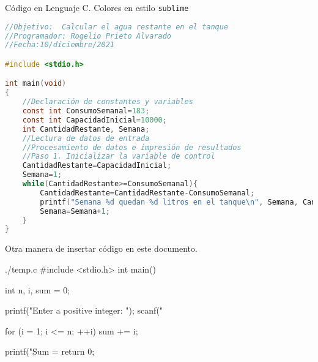 \documentclass[spanish,11pt,twoside]{article}
\begin{document}
\vspace{20pt}
Código en Lenguaje C. Colores en estilo \texttt{sublime}
\begin{mdframed}[backgroundcolor=clr-background,topline=true,bottomline=true,leftline=false,rightline=false,innerleftmargin=\leftskip, innertopmargin=0pt]

	\begin{lstlisting}[language=C]
//Objetivo:  Calcular el agua restante en el tanque 
//Programador: Rogelio Prieto Alvarado
//Fecha:10/diciembre/2021

#include <stdio.h>

int main(void)
{
	//Declaración de constantes y variables
	const int ConsumoSemanal=183;
	const int CapacidadInicial=10000;
	int CantidadRestante, Semana;
	//Lectura de datos de entrada
	//Procesamiento de datos e impresión de resultados
	//Paso 1. Inicializar la variable de control
	CantidadRestante=CapacidadInicial;
	Semana=1;
	while(CantidadRestante>=ConsumoSemanal){
		CantidadRestante=CantidadRestante-ConsumoSemanal;
		printf("Semana %d quedan %d litros en el tanque\n", Semana, CantidadRestante);
		Semana=Semana+1;
	}
} \end{lstlisting}
\end{mdframed}




\newpage
Otra manera de insertar código en este documento.

\begin{verbatimwrite}{./temp.c}
	#include <stdio.h>
	int main() {
		int n, i, sum = 0;
		
		printf("Enter a positive integer: ");
		scanf("%
		
		for (i = 1; i <= n; ++i) {
			sum += i;
		}
		
		printf("Sum = %
		return 0;
	}
\end{verbatimwrite}
\begin{mdframed}[backgroundcolor=clr-background,topline=true,bottomline=true,leftline=false,rightline=false,innerleftmargin=\leftskip, innertopmargin=0pt]
	
\end{mdframed}


\end{document}
